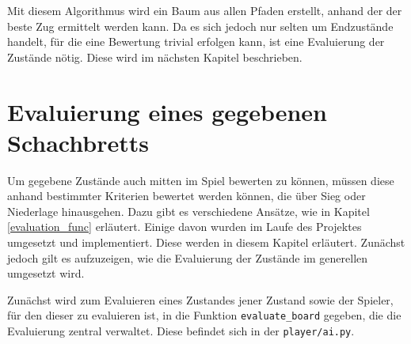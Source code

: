     Mit diesem Algorithmus wird ein Baum aus allen Pfaden erstellt, anhand
der der beste Zug ermittelt werden kann. Da es sich jedoch nur selten um Endzustände handelt, für
die eine Bewertung trivial erfolgen kann, ist eine Evaluierung der
Zustände nötig. Diese wird im nächsten Kapitel beschrieben.

    \section{Evaluierung eines gegebenen
Schachbretts}\label{evaluierung-eines-gegebenen-schachbretts}

    Um gegebene Zustände auch mitten im Spiel bewerten zu können, müssen
diese anhand bestimmter Kriterien bewertet werden können, die über Sieg
oder Niederlage hinausgehen. Dazu gibt es verschiedene Ansätze, wie in
Kapitel \ref{evaluation_func} erläutert. Einige davon wurden im Laufe des Projektes
umgesetzt und implementiert. Diese werden in diesem Kapitel erläutert.
Zunächst jedoch gilt es aufzuzeigen, wie die Evaluierung der Zustände im
generellen umgesetzt wird.

Zunächst wird zum Evaluieren eines Zustandes jener Zustand sowie der
Spieler, für den dieser zu evaluieren ist, in die Funktion
\texttt{evaluate\_board} gegeben, die die Evaluierung zentral verwaltet.
Diese befindet sich in der \texttt{player/ai.py}.

